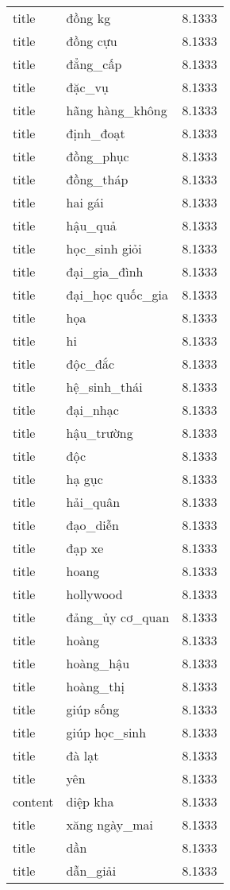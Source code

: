 \documentclass{article}
\begin{document}
\begin{tabular}{lll}
title & đồng kg & 8.1333\\
title & đồng cựu & 8.1333\\
title & đẳng\_cấp & 8.1333\\
title & đặc\_vụ & 8.1333\\
title & hãng hàng\_không & 8.1333\\
title & định\_đoạt & 8.1333\\
title & đồng\_phục & 8.1333\\
title & đồng\_tháp & 8.1333\\
title & hai gái & 8.1333\\
title & hậu\_quả & 8.1333\\
title & học\_sinh giỏi & 8.1333\\
title & đại\_gia\_đình & 8.1333\\
title & đại\_học quốc\_gia & 8.1333\\
title & họa & 8.1333\\
title & hi & 8.1333\\
title & độc\_đắc & 8.1333\\
title & hệ\_sinh\_thái & 8.1333\\
title & đại\_nhạc & 8.1333\\
title & hậu\_trường & 8.1333\\
title & độc & 8.1333\\
title & hạ gục & 8.1333\\
title & hải\_quân & 8.1333\\
title & đạo\_diễn & 8.1333\\
title & đạp xe & 8.1333\\
title & hoang & 8.1333\\
title & hollywood & 8.1333\\
title & đảng\_ủy cơ\_quan & 8.1333\\
title & hoàng & 8.1333\\
title & hoàng\_hậu & 8.1333\\
title & hoàng\_thị & 8.1333\\
title & giúp sống & 8.1333\\
title & giúp học\_sinh & 8.1333\\
title & đà lạt & 8.1333\\
title & yên & 8.1333\\
content & diệp kha & 8.1333\\
title & xăng ngày\_mai & 8.1333\\
title & dần & 8.1333\\
title & dẫn\_giải & 8.1333\\

\end{tabular}
\end{document}
